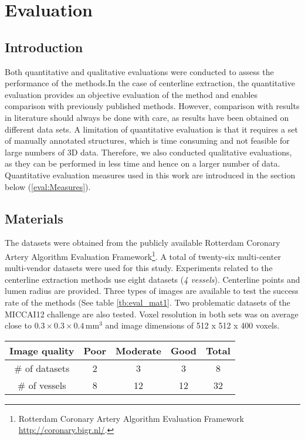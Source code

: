 \chapter{Evaluation}\label{eval:eval}

\section{Introduction}

Both quantitative and qualitative evaluations were conducted to assess the performance of the methods.In the case of centerline extraction, the quantitative evaluation provides an objective evaluation of the method and enables comparison with previously published methods. However, comparison with results in literature should always be done with care, as results have been obtained on different data sets. A limitation of quantitative evaluation is that it requires a set of manually annotated structures, which is time consuming and not feasible for large numbers of 3D data. Therefore, we also conducted qualitative evaluations, as they can be performed in less time and hence on a larger number of data. Quantitative evaluation measures used in this work are introduced in the section below (\ref{eval:Measures}).

\section{Materials}\label{eval:Materials}
 
The datasets were obtained from the publicly available Rotterdam Coronary Artery Algorithm Evaluation Framework\footnote{Rotterdam Coronary Artery Algorithm Evaluation Framework \href{http://coronary.bigr.nl/}{http://coronary.bigr.nl/}.}. A total of twenty-six multi-center multi-vendor datasets were used for this study. 
Experiments related to the centerline extraction methods use eight datasets (\textit{4 vessels}). Centerline points and lumen radius are provided. Three types of images are available to test the success rate of the methods (See table \ref{tb:eval_mat1}. Two problematic datasets of the MICCAI12 challenge are also tested. Voxel resolution in both sets was on average close to $0.3 \times 0.3 \times 0.4${\,}mm$^3$ and image dimensions of 512 x  512 x 400 voxels.

\begin{table*}
\scriptsize
\caption{Image quality of the CAT08 datasets and vessels}
\centering
\begin{tabular}{|c|c|c|c|c|}
\hline
\multicolumn{1}{|c|}{Image quality} &\multicolumn{1}{c|}{\textbf{Poor}} &\multicolumn{1}{c|}{\textbf{Moderate}} &\multicolumn{1}{c|}{\textbf{Good}}&\multicolumn{1}{c|}{\textbf{Total}}\\
\hline
\# of datasets&2 &3&3 &8\\
\# of vessels&8 &12&12 &32\\
\hline
\end{tabular}
\vspace{-0.3cm}
\label{tb:eval_mat1}
\normalsize
\end{table*}
 
